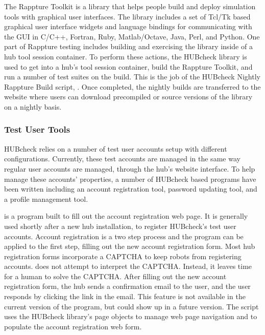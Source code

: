 The Rappture Toolkit \cite{RapptureToolkit:Online} is a library that helps
people build and deploy simulation tools with graphical user interfaces. The
library includes a set of Tcl/Tk based graphical user interface widgets and
language bindings for communicating with the GUI in C/C++, Fortran, Ruby,
Matlab/Octave, Java, Perl, and Python.  One part of Rappture testing includes
building and exercising the library inside of a hub tool session container. To
perform these actions, the HUBcheck library is used to get into a hub's tool
session container, build the Rappture Toolkit, and run a number of test suites
on the build. This is the job of the HUBcheck Nightly Rappture Build script,
. Once completed, the nightly builds are transferred to
the  website where users can download precompiled or
source versions of the library on a nightly basis.





\subsubsection{Test User Tools}
\label{sssec:hubcheck_tools_examples_tut}

HUBcheck relies on a number of test user accounts setup with different
configurations. Currently, these test accounts are managed in the same way
regular user accounts are managed, through the hub's website interface. To
help manage these accounts' properties, a number of HUBcheck based programs
have been written including an account registration tool, password updating
tool, and a profile management tool.


 is a program built to fill out the account
registration web page. It is generally used shortly after a new hub
installation, to register HUBcheck's test user accounts. Account registration
is a two step process and the  program can be
applied to the first step, filling out the new account registration form. Most
hub registration forms incorporate a CAPTCHA to keep robots from registering
accounts.  does not attempt to interpret the
CAPTCHA. Instead, it leaves time for a human to solve the CAPTCHA. After
filling out the new account registration form, the hub sends a confirmation
email to the user, and the user responds by clicking the link in the email.
This feature is not available in the current version of the
 program, but could show up in a future
version. The  script uses the HUBcheck
library's page objects to manage web page navigation and to populate the
account registration web form.

